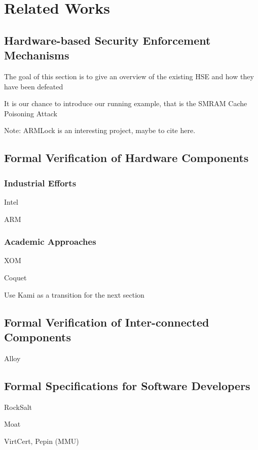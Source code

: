 \chapter{Related Works}

\section{Hardware-based Security Enforcement Mechanisms}

\begin{compactitem}
  \item The goal of this section is to give an overview of the existing HSE and how
    they have been defeated
  \item It is our chance to introduce our running example,
    that is the SMRAM Cache Poisoning Attack
\end{compactitem}

Note: ARMLock is an interesting project, maybe to cite here.

\section{Formal Verification of Hardware Components}

\subsection{Industrial Efforts}

\begin{compactitem}
\item Intel
\item ARM
\end{compactitem}

\subsection{Academic Approaches}

\begin{compactitem}
\item XOM
\item Coquet
\item Use Kami as a transition for the next section
\end{compactitem}

\section{Formal Verification of Inter-connected Components}

\begin{compactitem}
\item Alloy
\end{compactitem}

\section{Formal Specifications for Software Developers}

\begin{compactitem}
\item RockSalt
\item Moat
\item VirtCert, Pepin (MMU)
\end{compactitem}